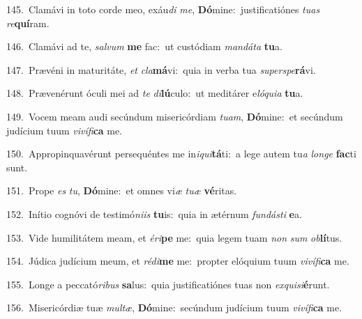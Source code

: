 {\numbfont\textcolor{\numbcolor}{145.}}~Clamávi in toto corde meo, exáu\textit{di} \textit{me}\-, \textbf{Dó}\-mine:~\star justificatiónes \textit{tu}\-\textit{as} \textit{re}\-\textbf{quí}ram.\par
{\numbfont\textcolor{\numbcolor}{146.}}~Clamávi ad te, \textit{sal}\-\textit{vum} \textbf{me} fac:~\star ut custódiam \textit{man}\-\textit{dá}\textit{ta} \textbf{tu}\-a.\par
{\numbfont\textcolor{\numbcolor}{147.}}~Prævéni in maturitáte, \textit{et} \textit{cla}\-\textbf{má}vi:~\star quia in verba tua \textit{su}\-\textit{per}\textit{spe}\textbf{rá}vi.\par
{\numbfont\textcolor{\numbcolor}{148.}}~Prævenérunt óculi mei ad \textit{te} \textit{di}\-\textbf{lú}culo:~\star ut meditárer e\-\textit{ló}\-\textit{qui}\textit{a} \textbf{tu}\-a.\par
{\numbfont\textcolor{\numbcolor}{149.}}~Vocem meam audi secúndum misericórdiam \textit{tu}\-\textit{am}, \textbf{Dó}\-mine:~\star et secúndum judícium tuum \textit{vi}\-\textit{ví}\textit{fi}\textbf{ca} me.\par
{\numbfont\textcolor{\numbcolor}{150.}}~Appropinquavérunt persequéntes me in\-\textit{i}\-\textit{qui}\textbf{tá}ti:~\star a lege autem tu\textit{a} \textit{lon}\-\textit{ge} \textbf{fac}\-ti sunt.\par
{\numbfont\textcolor{\numbcolor}{151.}}~Prope \textit{es} \textit{tu}\-, \textbf{Dó}\-mine:~\star et omnes vi\textit{æ} \textit{tu}\-\textit{æ} \textbf{vé}\-ritas.\par
{\numbfont\textcolor{\numbcolor}{152.}}~Inítio cognóvi de testimó\-\textit{ni}\-\textit{is} \textbf{tu}\-is:~\star quia in ætérnum \textit{fun}\-\textit{dás}\textit{ti} \textbf{e}\-a.\par
{\numbfont\textcolor{\numbcolor}{153.}}~Vide humilitátem meam, et \textit{é}\-\textit{ri}\textbf{pe} me:~\star quia legem tuam \textit{non} \textit{sum} \textit{ob}\-\textbf{lí}tus.\par
{\numbfont\textcolor{\numbcolor}{154.}}~Júdica judícium meum, et \textit{réd}\-\textit{i}\textbf{me} me:~\star propter elóquium tuum \textit{vi}\-\textit{ví}\textit{fi}\textbf{ca} me.\par
{\numbfont\textcolor{\numbcolor}{155.}}~Longe a peccató\-\textit{ri}\-\textit{bus} \textbf{sa}\-lus:~\star quia justificatiónes tuas non \textit{ex}\-\textit{qui}\textit{si}\textbf{é}runt.\par
{\numbfont\textcolor{\numbcolor}{156.}}~Misericórdiæ tuæ \textit{mul}\-\textit{tæ}, \textbf{Dó}\-mine:~\star secúndum judícium tuum \textit{vi}\-\textit{ví}\textit{fi}\textbf{ca} me.\par
